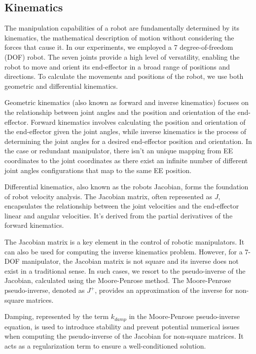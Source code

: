\documentclass[a4paper]{article}
\begin{document}
\subsection{Kinematics}

The manipulation capabilities of a robot are fundamentally determined by its kinematics, the mathematical description of motion without considering the forces that cause it. In our experiments, we employed a 7 degree-of-freedom (DOF) robot. The seven joints provide a high level of versatility, enabling the robot to move and orient its end-effector in a broad range of positions and directions. To calculate the movements and positions of the robot, we use both geometric and differential kinematics.

Geometric kinematics (also known as forward and inverse kinematics) focuses on the relationship between joint angles and the position and orientation of the end-effector. Forward kinematics involves calculating the position and orientation of the end-effector given the joint angles, while inverse kinematics is the process of determining the joint angles for a desired end-effector position and orientation. In the case or redundant manipulator, there isn't an unique mapping from EE coordinates to the joint coordinates as there exist an infinite number of different joint angles configurations that map to the same EE position.

Differential kinematics, also known as the robots Jacobian, forms the foundation of robot velocity analysis. The Jacobian matrix, often represented as $J$, encapsulates the relationship between the joint velocities and the end-effector linear and angular velocities. It's derived from the partial derivatives of the forward kinematics.

The Jacobian matrix is a key element in the control of robotic manipulators. It can also be used for computing the inverse kinematics problem. However, for a 7-DOF manipulator, the Jacobian matrix is not square and its inverse does not exist in a traditional sense. In such cases, we resort to the pseudo-inverse of the Jacobian, calculated using the Moore-Penrose method. The Moore-Penrose pseudo-inverse, denoted as $J^+$, provides an approximation of the inverse for non-square matrices. 

Damping, represented by the term $k_{damp}$ in the Moore-Penrose pseudo-inverse equation, is used to introduce stability and prevent potential numerical issues when computing the pseudo-inverse of the Jacobian for non-square matrices. It acts as a regularization term to ensure a well-conditioned solution.
\end{document}
